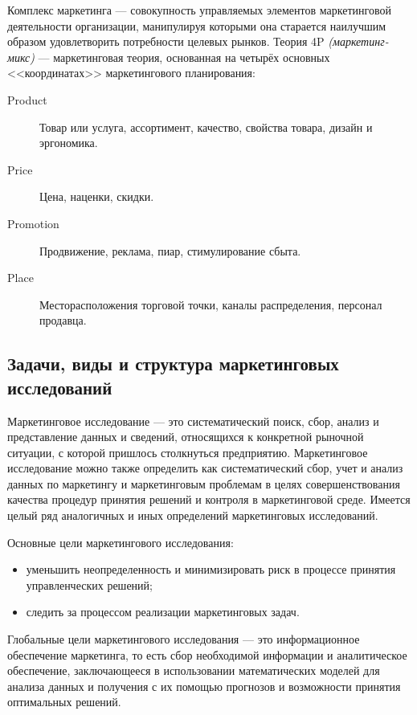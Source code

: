 \documentclass[a4paper,12pt,oneside,final]{extarticle}
\numberwithin{equation}{section}
\begin{document}
\begin{enumerate}
Комплекс маркетинга --- совокупность управляемых элементов маркетинговой деятельности организации, манипулируя которыми она старается наилучшим образом удовлетворить потребности целевых рынков.
Теория 4P \textit{(маркетинг-микс)} — маркетинговая теория, основанная на четырёх основных <<координатах>> маркетингового планирования:
\begin{description}
	\item[Product] Товар или услуга, ассортимент, качество, свойства товара, дизайн и эргономика.
	\item[Price] Цена, наценки, скидки.
	\item[Promotion] Продвижение, реклама, пиар, стимулирование сбыта.
	\item[Place] Месторасположения торговой точки, каналы распределения, персонал продавца.
\end{description}

\subsection{Задачи, виды и структура маркетинговых исследований}
Маркетинговое исследование --- это систематический поиск, сбор, анализ и представление данных и сведений, относящихся к конкретной рыночной ситуации, с которой пришлось столкнуться предприятию. 
Маркетинговое исследование можно также определить как систематический сбор, учет и анализ данных по маркетингу и маркетинговым проблемам в целях совершенствования качества процедур принятия решений и контроля в маркетинговой среде. 
Имеется целый ряд аналогичных и иных определений маркетинговых исследований.

Основные цели маркетингового исследования:
\begin{itemize}
	\item уменьшить неопределенность и минимизировать риск в процессе принятия управленческих решений;
	\item следить за процессом реализации маркетинговых задач.
\end{itemize}

Глобальные цели маркетингового исследования --- это информационное обеспечение маркетинга, то есть сбор необходимой информации и аналитическое обеспечение, заключающееся в использовании математических моделей для анализа данных и получения с их помощью прогнозов и возможности принятия оптимальных решений.


\end{enumerate}
\end{document}
